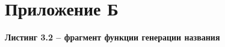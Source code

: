 \chapter*{Приложение Б}\label{ux43fux440ux438ux43bux43eux436ux435ux43dux438ux435-ux431}

\textbf{Листинг 3.2 -- фрагмент функции генерации названия}


